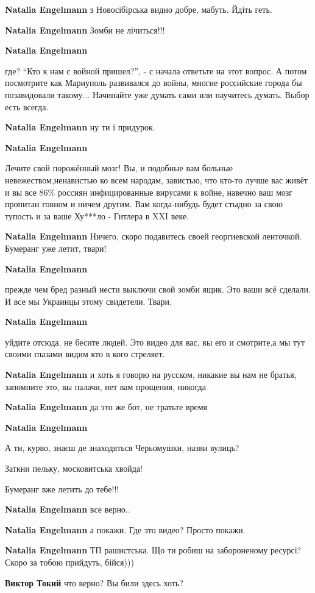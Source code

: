 \begin{itemize} %
\textbf{Natalia Engelmann} з Новосібірська видно добре, мабуть. Йдіть геть.

\textbf{Natalia Engelmann} Зомби не лічиться!!!

\textbf{Natalia Engelmann} 

где? \enquote{Кто к нам с войной пришел?}, - с начала ответьте на этот вопрос. А потом
посмотрите как Мариуполь развивался до войны, многие российские города бы
позавидовали такому... Начинайте уже думать сами или научитесь думать. Выбор
есть всегда.

\textbf{Natalia Engelmann} ну ти і придурок.

\textbf{Natalia Engelmann} 

Лечите свой порожённый мозг! Вы, и подобные вам больные невежеством,ненавистью
ко всем народам, завистью, что кто-то лучше вас живёт и вы все 86\% россиян
инфицированные вирусами к войне, навечно ваш мозг пропитан говном и ничем
другим. Вам когда-нибудь будет стыдно за свою тупость и за ваше Ху***ло -
Гитлера в XXI веке.

\textbf{Natalia Engelmann} Ничего, скоро подавитесь своей георгиевской ленточкой. Бумеранг уже летит, твари!

\textbf{Natalia Engelmann} 

прежде чем бред разный нести выключи свой зомби ящик. Это ваши всё сделали. И
все мы Украинцы этому свидетели. Твари.

\textbf{Natalia Engelmann} 

уйдите отсюда, не бесите людей. Это видео для вас, вы его и смотрите,а мы тут
своими глазами видим кто в кого стреляет.

\textbf{Natalia Engelmann} и хоть я говорю на русском, никакие вы нам не братья, запомните это, вы палачи, нет вам прощения, никогда

\textbf{Natalia Engelmann} да это же бот, не тратьте время

\textbf{Natalia Engelmann}

А ти, курво, знаєш де знаходяться Черьомушки, назви вулиць?

Заткни пельку, московитська хвойда!

Бумеранг вже летить до тебе!!!

\textbf{Natalia Engelmann} все верно..

\textbf{Natalia Engelmann} а покажи. Где это видео? Просто покажи.

\textbf{Natalia Engelmann} ТП рашистська.
Що ти робиш на забороненому ресурсі?
Скоро за тобою прийдуть, бійся)))

\textbf{Виктор Токий} что верно? Вы били здесь хоть?

\end{itemize} %

